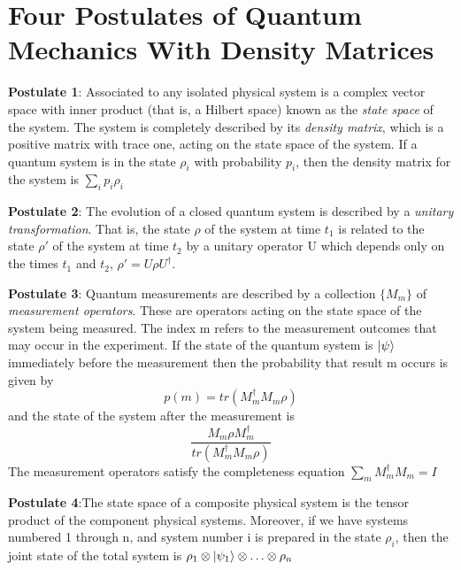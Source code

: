 
\chapter{Four Postulates of Quantum Mechanics With Density Matrices} %

\label{AppendixA} %

\textbf{Postulate 1}: Associated to any isolated physical system is a complex vector space with inner product (that is, a Hilbert space) known as the \textit{state space} of the system. The system is completely described by its \textit{density matrix}, which is a positive matrix with trace one, acting on the state space of the system. If a quantum system is in the state $\rho_i$ with probability $p_i$, then the density matrix for the system is $\sum_i p_i \rho_i$

\textbf{Postulate 2}: The evolution of a closed quantum system is described by a \textit{unitary transformation}. That is, the state $\rho$ of the system at time $t_1$ is related to the state $\rho'$ of the system at time $t_2$ by a unitary operator U which depends only on the times $t_1$ and $t_2$, $\rho'=U\rho U^\dagger$.

\textbf{Postulate 3}: Quantum measurements are described by a collection $\{M_m\}$ of \textit{measurement operators}. These are operators acting on the state space of the system being measured. The index m refers to the measurement outcomes that may occur in the experiment. If the state of the quantum system is $\ket{\psi}$ immediately before the measurement then the probability that result m occurs is given by 
    \begin{equation}
        p(m)=tr(M_m^\dagger M_m \rho)
    \end{equation}
    and the state of the system after the measurement is
    \begin{equation}
        \frac{M_m \rho M_m^\dagger}{tr(M_m^\dagger M_m \rho)}
    \end{equation}
    The measurement operators satisfy the completeness equation $\sum_m M_m^\dagger M_m =I$
    
\textbf{Postulate 4}:The state space of a composite physical system is the tensor product of the component physical systems. Moreover, if we have systems numbered 1 through n, and system number i is prepared in the state $\rho_i$, then the joint state of the total system is $\rho_1 \otimes \ket{\psi_1} \otimes \hdots \otimes \rho_n$

